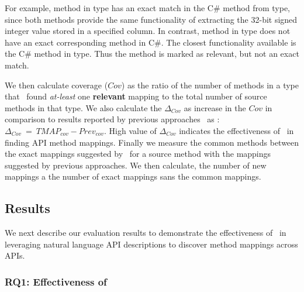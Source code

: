 For example,  method in  type has an exact match in the C\# method  from  type, since both methods provide the same functionality of extracting the 32-bit signed integer value stored in a specified column.
In contrast,  method in  type does not have an exact corresponding method in C\#. The closest functionality available is the C\# method  in  type. 
Thus the method  is marked as relevant, but not an exact match.


We then calculate coverage ($Cov$) as the ratio of the number of methods in a type that \tool\ found \textit{at-least} one \textbf{relevant} mapping to the total number of source methods in that type.
We also calculate the $\Delta_{Cov}$ as increase in the $Cov$ in comparison to results reported by previous approaches~\cite{Gokhale2013ICSE,nguyen2014statistical} as : $\Delta_{Cov}\ =\  TMAP_{cov} - Prev_{cov}$.
High value of $\Delta_{Cov}$ indicates the effectiveness of \tool\ in finding API method mappings.
Finally we measure the common methods between the exact mappings suggested by \tool\ for a source method with the mappings suggested by previous approaches.
We then calculate, the number of new mappings a the number of exact mappings sans the common mappings.

\subsection {Results}

We next describe our evaluation results to demonstrate the effectiveness of \tool\ in leveraging natural language API descriptions to discover method mappings across APIs.

\subsubsection{RQ1: Effectiveness of \tool\ }

